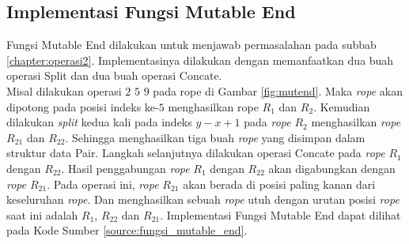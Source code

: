 \subsection{Implementasi Fungsi Mutable End}
Fungsi Mutable End dilakukan untuk menjawab permasalahan pada subbab \ref{chapter:operasi2}. Implementasinya dilakukan dengan memanfaatkan dua buah operasi Split dan dua buah operasi Concate.\\
Misal dilakukan operasi $2$ $5$ $9$ pada rope di Gambar \ref{fig:mutend}. Maka \textit{rope} akan dipotong pada posisi indeks ke-$5$ menghasilkan rope $R_1$ dan $R_2$. Kemudian dilakukan \textit{split} kedua kali pada indeks $y-x+1$ pada \textit{rope} $R_2$ menghasilkan \textit{rope} $R_{21}$ dan $R_{22}$. Sehingga menghasilkan tiga buah \textit{rope} yang disimpan dalam struktur data Pair. Langkah selanjutnya dilakukan operasi Concate pada \textit{rope} $R_1$ dengan $R_{22}$. Hasil penggabungan \textit{rope} $R_1$ dengan $R_{22}$ akan digabungkan dengan \textit{rope} $R_{21}$. Pada operasi ini, \textit{rope} $R_{21}$ akan berada di posisi paling kanan dari keseluruhan \textit{rope}. Dan menghasilkan sebuah \textit{rope} utuh dengan urutan posisi \textit{rope} saat ini adalah $R_1$, $R_{22}$ dan $R_{21}$. Implementasi Fungsi Mutable End dapat dilihat pada Kode Sumber \ref{source:fungsi_mutable_end}.
